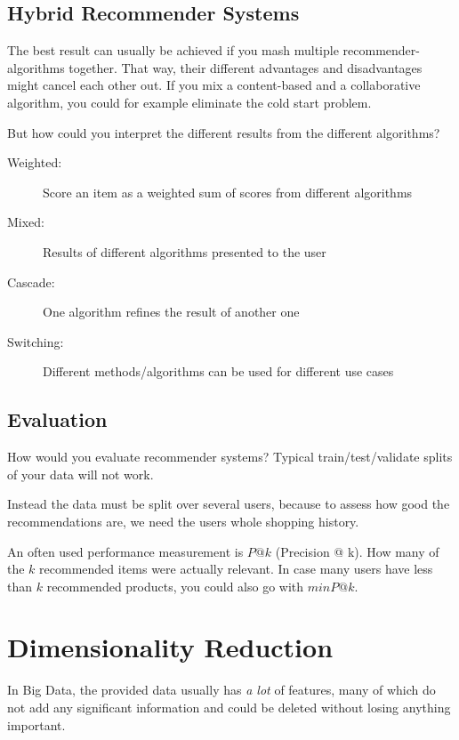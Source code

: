 \documentclass[11pt]{article}
\begin{document}
\subsection{Hybrid Recommender Systems}

The best result can usually be achieved if you mash multiple recommender-algorithms together. That way, their different advantages and disadvantages might cancel each other out. If you mix a content-based and a collaborative algorithm, you could for example eliminate the cold start problem.

But how could you interpret the different results from the different algorithms?

\begin{description}
    \item[Weighted: ] Score an item as a weighted sum of scores from different algorithms
    \item[Mixed: ] Results of different algorithms presented to the user
    \item[Cascade: ] One algorithm refines the result of another one
    \item[Switching: ] Different methods/algorithms can be used for different use cases
\end{description}

\subsection{Evaluation}

How would you evaluate recommender systems? Typical train/test/validate splits of your data will not work.

Instead the data must be split over several users, because to assess how good the recommendations are, we need the users whole shopping history.

\vspace{10px}

An often used performance measurement is $P@k$ (Precision @ k). How many of the $k$ recommended items were actually relevant. In case many users have less than $k$ recommended products, you could also go with $minP@k$.

\section{Dimensionality Reduction}

In Big Data, the provided data usually has \textit{a lot} of features, many of which do not add any significant information and could be deleted without losing anything important.
\end{document}
